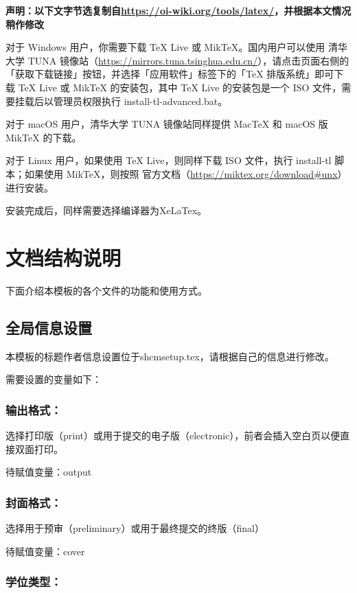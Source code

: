 \textbf{声明：以下文字节选复制自\url{https://oi-wiki.org/tools/latex/}，并根据本文情况稍作修改}

对于 Windows 用户，你需要下载 TeX Live 或 MikTeX。国内用户可以使用 清华大学 TUNA 镜像站（\url{https://mirrors.tuna.tsinghua.edu.cn/}），请点击页面右侧的「获取下载链接」按钮，并选择「应用软件」标签下的「TeX 排版系统」即可下载 TeX Live 或 MikTeX 的安装包，其中 TeX Live 的安装包是一个 ISO 文件，需要挂载后以管理员权限执行 install-tl-advanced.bat。

对于 macOS 用户，清华大学 TUNA 镜像站同样提供 MacTeX 和 macOS 版 MikTeX 的下载。

对于 Linux 用户，如果使用 TeX Live，则同样下载 ISO 文件，执行 install-tl 脚本；如果使用 MikTeX，则按照 官方文档（\url{https://miktex.org/download\#unx}） 进行安装。

安装完成后，同样需要选择编译器为XeLaTex。

\section{文档结构说明}

下面介绍本模板的各个文件的功能和使用方式。

\subsection{全局信息设置}

本模板的标题作者信息设置位于shcmsetup.tex，请根据自己的信息进行修改。

需要设置的变量如下：

\subsubsection{输出格式：}

选择打印版（print）或用于提交的电子版（electronic），前者会插入空白页以便直接双面打印。

待赋值变量：output

\subsubsection{封面格式：}

选择用于预审（preliminary）或用于最终提交的终版（final）

待赋值变量：cover

\subsubsection{学位类型：}

